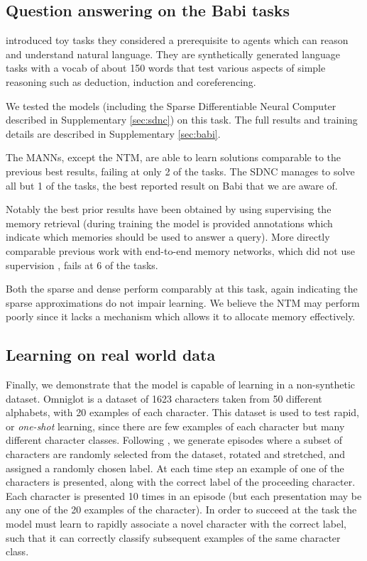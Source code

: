 \documentclass{article}
\begin{document}
\subsection{Question answering on the Babi tasks}

\cite{weston2015towards} introduced toy tasks they considered a prerequisite to agents which can reason and understand natural language. They are synthetically generated language tasks with a vocab of about 150 words that test various aspects of simple reasoning such as deduction, induction and coreferencing.

We tested the models (including the Sparse Differentiable Neural Computer described in Supplementary \ref{sec:sdnc}) on this task. The full results and training details are described in Supplementary \ref{sec:babi}.

The MANNs, except the NTM, are able to learn solutions comparable to the previous best results, failing at only 2 of the tasks. The SDNC manages to solve all but 1 of the tasks, the best reported result on Babi that we are aware of.

Notably the best prior results have been obtained by using supervising the memory retrieval (during training the model is provided annotations which indicate which memories should be used to answer a query). More directly comparable previous work with end-to-end memory networks, which did not use supervision \cite{sukhbaatar2015end}, fails at 6 of the tasks.

Both the sparse and dense perform comparably at this task, again indicating the sparse approximations do not impair learning. We believe the NTM may perform poorly since it lacks a mechanism which allows it to allocate memory effectively.




\subsection{Learning on real world data}

Finally, we demonstrate that the model is capable of learning in a non-synthetic dataset. Omniglot \cite{lake2015human} is a dataset of 1623 characters taken from 50 different alphabets,
with 20 examples of each character.
This dataset is used to test rapid, or \textit{one-shot} learning, since there are few examples of each character but many different character classes. Following \cite{santoro2016}, we generate episodes where a subset of characters are randomly selected from the dataset, rotated and stretched, and assigned a randomly chosen label. At each time step an example of one of the characters is presented, along with the correct label of the proceeding character. Each character is presented 10 times in an episode (but each presentation may be any one of the 20 examples of the character). In order to succeed at the task the model must learn to rapidly associate a novel character with the correct label, such that it can correctly classify subsequent examples of the same character class.
\end{document}

